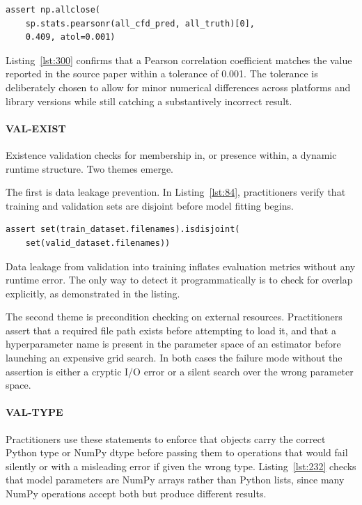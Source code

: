 \begin{lstlisting}[caption={}, label={lst:300}]
assert np.allclose(
    sp.stats.pearsonr(all_cfd_pred, all_truth)[0],
    0.409, atol=0.001)
\end{lstlisting}

Listing~\ref{lst:300} confirms that a Pearson correlation coefficient
matches the value reported in the source paper
within a tolerance of 0.001.
The tolerance is deliberately chosen
to allow for minor numerical differences across platforms and library versions
while still catching a substantively incorrect result.

\paragraph{VAL-EXIST}

Existence validation checks for membership in,
or presence within,
a dynamic runtime structure.
Two themes emerge.

The first is data leakage prevention.
In Listing~\ref{lst:84},
practitioners verify that training and validation sets are disjoint before model fitting begins.

\begin{lstlisting}[caption={}, label={lst:84}]
assert set(train_dataset.filenames).isdisjoint(
    set(valid_dataset.filenames))
\end{lstlisting}

Data leakage from validation into training inflates evaluation metrics
without any runtime error.
The only way to detect it programmatically
is to check for overlap explicitly,
as demonstrated in the listing.

The second theme is precondition checking on external resources.
Practitioners assert that a required file path exists
before attempting to load it,
and that a hyperparameter name is present in the parameter space of an estimator
before launching an expensive grid search.
In both cases the failure mode without the assertion
is either a cryptic I/O error
or a silent search over the wrong parameter space.

\paragraph{VAL-TYPE}

Practitioners use these statements to enforce
that objects carry the correct Python type or NumPy dtype
before passing them to operations that would fail silently
or with a misleading error
if given the wrong type.
Listing~\ref{lst:232} checks that model parameters are NumPy arrays
rather than Python lists,
since many NumPy operations accept both but produce different results.


